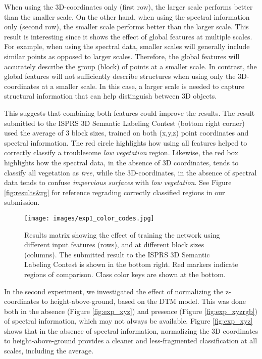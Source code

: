 \documentclass[final,3p,times,twocolumn,authoryear]{elsarticle}
\begin{document}
When using the 3D-coordinates only (first row), the larger scale performs better than the smaller scale.
On the other hand, when using the spectral information only (second row), the smaller scale performs better than the larger scale. 
This result is interesting since it shows the effect of global features at multiple scales. 
For example, when using the spectral data, smaller scales will generally include similar points as opposed to larger scales. 
Therefore, the global features will accurately describe the group (block) of points at a smaller scale. 
In contrast, the global features will not sufficiently describe structures when using only the 3D-coordinates at a smaller scale. 
In this case, a larger scale is needed to capture structural information that can help distinguish between 3D objects.

This suggests that combining both features could improve the results. 
The result submitted to the ISPRS 3D Semantic Labeling Contest (bottom right corner) used the average of 3 block sizes, trained on both (x,y,z) point coordinates and spectral information. 
The red circle highlights how using all features helped to correctly classify a troublesome {\it low vegetation} region. 
Likewise, the red box highlights how the spectral data, in the absence of 3D coordinates, tends to classify all vegetation as {\it tree}, while the 3D-coordinates, in the absence of spectral data tends to confuse {\it impervious surfaces} with {\it low vegetation}.
See Figure \ref{fig:results&rg} for reference regrading correctly classified regions in our submission.

\begin{figure*}[th]
\begin{center}
\texttt{[image: images/exp1\_color\_codes.jpg]}
\end{center}
\caption{Results matrix showing the effect of training the network using different input features (rows), and at different block sizes (columns). The submitted result to the ISPRS 3D Semantic Labeling Contest is shown in the bottom right. Red markers indicate regions of comparison. Class color keys are shown at the bottom.}
\label{fig:exp1}
\end{figure*}

In the second experiment, we investigated the effect of normalizing the z-coordinates to height-above-ground, based on the DTM model. 
This was done both in the absence (Figure \ref{fig:exp_xyz}) and presence (Figure \ref{fig:exp_xyzrgb}) of spectral information, which may not always be available.  
Figure \ref{fig:exp_xyz} shows that in the absence of spectral information, normalizing the 3D coordinates to height-above-ground provides a cleaner and less-fragmented classification at all scales, including the average.
\end{document}
